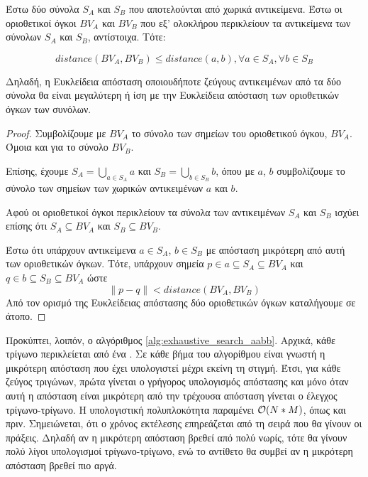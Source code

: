 \begin{lemma}
    Έστω δύο σύνολα $S_A$ και $S_B$ που αποτελούνται από χωρικά αντικείμενα. 
    Έστω οι οριοθετικοί όγκοι $BV_A$ και $BV_B$ που εξ' ολοκλήρου περικλείουν 
    τα αντικείμενα των σύνολων  $S_A$ και $S_B$, αντίστοιχα. Τότε:
    
    \[ distance(BV_A, BV_B) \leq distance(a, b) , 
    \forall a \in S_A, \forall b \in S_B \]

    Δηλαδή, η Ευκλείδεια απόσταση οποιουδήποτε ζεύγους αντικειμένων από τα δύο σύνολα 
    θα είναι μεγαλύτερη ή ίση με την Ευκλείδεια απόσταση των οριοθετικών όγκων 
    των συνόλων.
    \label{lemma:box_distance}
\end{lemma}


\begin{proof}
    Συμβολίζουμε με $BV_A$ το σύνολο των σημείων του 
    οριοθετικού όγκου, $BV_A$. 
    Όμοια και για το σύνολο $BV_B$.

    Επίσης, έχουμε
    $S_A = \bigcup\limits_{a \in S_A} a $ και $S_B = \bigcup\limits_{b \in S_B} b$,
    όπου με $a$, $b$ συμβολίζουμε το σύνολο των σημείων των 
    χωρικών αντικειμένων $a$ και $b$.

    Αφού οι οριοθετικοί όγκοι περικλείουν τα σύνολα των 
    αντικειμένων $S_A$ και $S_B$ ισχύει επίσης ότι 
    $S_A \subseteq BV_A $ και 
    $S_B \subseteq BV_B $.

    Έστω ότι υπάρχουν αντικείμενα $a \in S_A$, $b \in S_B$ με απόσταση μικρότερη 
    από αυτή των οριοθετικών όγκων. Τότε, υπάρχουν σημεία $p \in a \subseteq S_A 
    \subseteq BV_A$ και $q \in b \subseteq S_B \subseteq BV_A$ ώστε 
    \[\lVert p - q \rVert < distance(BV_A, BV_B)\]
    Από τον ορισμό της Ευκλείδειας απόστασης δύο οριοθετικών όγκων καταλήγουμε 
    σε άτοπο.
\end{proof}

Προκύπτει, λοιπόν, ο αλγόριθμος \ref{alg:exhaustive_search_aabb}.
Αρχικά, κάθε τρίγωνο περικλείεται από 
ένα . Σε κάθε βήμα του αλγορίθμου είναι γνωστή η μικρότερη απόσταση 
που έχει υπολογιστεί μέχρι εκείνη τη στιγμή. Έτσι, για κάθε ζεύγος τριγώνων, 
πρώτα γίνεται ο γρήγορος υπολογισμός απόστασης  και μόνο όταν αυτή 
η απόσταση είναι μικρότερη από την τρέχουσα απόσταση γίνεται ο έλεγχος 
τρίγωνο-τρίγωνο.
Η υπολογιστική πολυπλοκότητα παραμένει $\mathcal{O}(N*M)$, όπως και πριν.
Σημειώνεται, ότι ο χρόνος εκτέλεσης επηρεάζεται από τη σειρά που θα γίνουν 
οι πράξεις. Δηλαδή αν η μικρότερη απόσταση βρεθεί από πολύ νωρίς, τότε 
θα γίνουν πολύ λίγοι υπολογισμοί τρίγωνο-τρίγωνο, ενώ το αντίθετο θα συμβεί 
αν η μικρότερη απόσταση βρεθεί πιο αργά.

